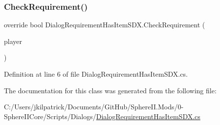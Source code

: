 \subsubsection{\texorpdfstring{CheckRequirement()}{CheckRequirement()}}
{\footnotesize\ttfamily override bool Dialog\+Requirement\+Has\+Item\+S\+D\+X.\+Check\+Requirement (\begin{DoxyParamCaption}\item[{Entity\+Player}]{player }\end{DoxyParamCaption})}



Definition at line 6 of file Dialog\+Requirement\+Has\+Item\+S\+D\+X.\+cs.



The documentation for this class was generated from the following file\+:\begin{DoxyCompactItemize}
\item 
C\+:/\+Users/jkilpatrick/\+Documents/\+Git\+Hub/\+Sphere\+I\+I.\+Mods/0-\/\+Sphere\+I\+I\+Core/\+Scripts/\+Dialogs/\mbox{\hyperlink{_dialog_requirement_has_item_s_d_x_8cs}{Dialog\+Requirement\+Has\+Item\+S\+D\+X.\+cs}}\end{DoxyCompactItemize}
